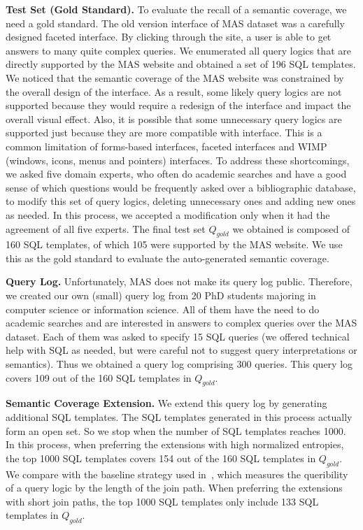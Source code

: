 \documentclass{vldb}
\begin{document}
\textbf{Test Set (Gold Standard).}
To evaluate the recall of a semantic coverage, we need a gold standard.  The old version interface of MAS dataset was a carefully designed faceted interface.  By clicking through the site, a user is able to get answers to many quite complex queries.  We enumerated all query logics that are directly supported by the MAS website and obtained a set of 196 SQL templates.  We noticed that the semantic coverage of the MAS website was constrained by the overall design of the interface. As a result, some likely query logics are not supported because they would require a redesign of the interface and impact the overall visual effect. Also, it is possible that some unnecessary query logics are supported just because they are more compatible with interface.  This is a common limitation of forms-based interfaces, faceted interfaces and WIMP (windows, icons, menus and pointers) interfaces.  To address these shortcomings, we asked five domain experts, who often do academic searches and have a good sense of which questions would be frequently asked over a bibliographic database, to modify this set of query logics, deleting unnecessary ones and adding new ones as needed.  In this process, we accepted a modification only when it had the agreement of all five experts. The final test set $Q_{gold}$ we obtained is composed of 160 SQL templates, of which 105 were supported by the MAS website. We use this as the gold standard to evaluate the auto-generated semantic coverage.

\textbf{Query Log.}
Unfortunately, MAS does not make its query log public.  Therefore, we created our own (small) query log from 20 PhD students majoring in computer science or information science.  All of them have the need to do academic searches and are interested in answers to complex queries over the MAS dataset.  Each of them was asked to specify 15 SQL queries (we offered technical help with SQL as needed, but were careful not to suggest query interpretations or semantics).  Thus we obtained a query log comprising 300 queries.  This query log covers 109 out of the 160 SQL templates in $Q_{gold}$.  

\textbf{Semantic Coverage Extension.}
We extend this query log by generating additional SQL templates.  The SQL templates generated in this process actually form an open set.  So we stop when the number of SQL templates reaches 1000.  In this process, when preferring the extensions with high normalized entropies, the top 1000 SQL templates covers 154 out of the 160 SQL templates in $Q_{gold}$.  We compare with the baseline strategy used in~\cite{DBLP:series/synthesis/2010Yu,DBLP:conf/icde/FanLZ11}, which measures the queribility of a query logic by the length of the join path.  When preferring the extensions with short join paths, the top 1000 SQL templates only include 133 SQL templates in $Q_{gold}$.
\end{document}
